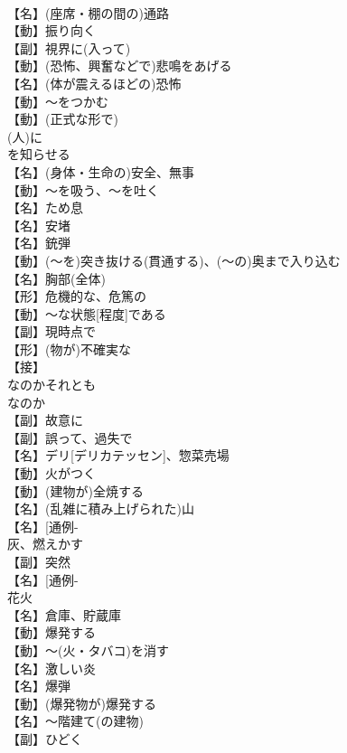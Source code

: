 \documentclass[8pt]{extreport}
\begin{document}
\begin{CJK}{UTF8}{min}
\\	【名】(座席・棚の間の)通路
\\	【動】振り向く
\\	【副】視界に(入って)
\\	【動】(恐怖、興奮などで)悲鳴をあげる
\\	【名】(体が震えるほどの)恐怖
\\	【動】～をつかむ
\\	【動】(正式な形で)
\\	(人)に
\\	を知らせる
\\	【名】(身体・生命の)安全、無事
\\	【動】～を吸う、～を吐く
\\	【名】ため息
\\	【名】安堵
\\	【名】銃弾
\\	【動】(～を)突き抜ける(貫通する)、(～の)奥まで入り込む
\\	【名】胸部(全体)
\\	【形】危機的な、危篤の
\\	【動】～な状態[程度]である
\\	【副】現時点で
\\	【形】(物が)不確実な
\\	【接】
\\	なのかそれとも
\\	なのか
\\	【副】故意に
\\	【副】誤って、過失で
\\	【名】デリ[デリカテッセン]、惣菜売場
\\	【動】火がつく
\\	【動】(建物が)全焼する
\\	【名】(乱雑に積み上げられた)山
\\	【名】[通例-
\\	灰、燃えかす
\\	【副】突然
\\	【名】[通例-
\\	花火
\\	【名】倉庫、貯蔵庫
\\	【動】爆発する
\\	【動】～(火・タバコ)を消す
\\	【名】激しい炎
\\	【名】爆弾
\\	【動】(爆発物が)爆発する
\\	【名】～階建て(の建物)
\\	【副】ひどく

\end{CJK}
\end{document}
